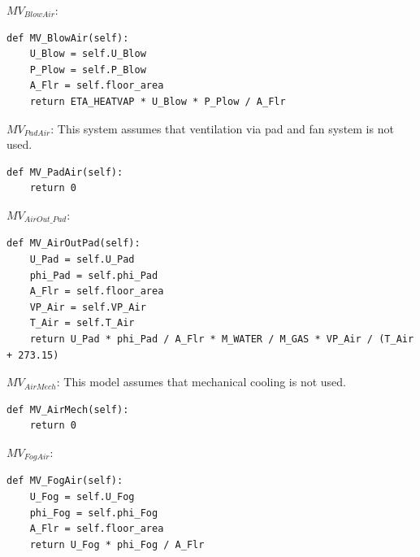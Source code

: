 \documentclass[a4paper]{article}
\numberwithin{equation}{section}
\begin{document}
\(MV_{BlowAir}\):
\begin{mdframed}[leftline=false,rightline=false,backgroundcolor=magenta!10,nobreak=true]
  \begin{verbatim}
def MV_BlowAir(self):
    U_Blow = self.U_Blow
    P_Plow = self.P_Blow
    A_Flr = self.floor_area
    return ETA_HEATVAP * U_Blow * P_Plow / A_Flr
  \end{verbatim}
\end{mdframed}

\(MV_{PadAir}\):
This system assumes that ventilation via pad and fan system is not used.
\begin{mdframed}[leftline=false,rightline=false,backgroundcolor=magenta!10,nobreak=true]
  \begin{verbatim}
def MV_PadAir(self):
    return 0
  \end{verbatim}
\end{mdframed}

\(MV_{AirOut\_Pad}\):
\begin{mdframed}[leftline=false,rightline=false,backgroundcolor=magenta!10,nobreak=true]
  \begin{verbatim}
def MV_AirOutPad(self):
    U_Pad = self.U_Pad
    phi_Pad = self.phi_Pad
    A_Flr = self.floor_area
    VP_Air = self.VP_Air
    T_Air = self.T_Air
    return U_Pad * phi_Pad / A_Flr * M_WATER / M_GAS * VP_Air / (T_Air + 273.15)
  \end{verbatim}
\end{mdframed}

\(MV_{AirMech}\):
This model assumes that mechanical cooling is not used.
\begin{mdframed}[leftline=false,rightline=false,backgroundcolor=magenta!10,nobreak=true]
  \begin{verbatim}
def MV_AirMech(self):
    return 0
  \end{verbatim}
\end{mdframed}

\(MV_{FogAir}\):
\begin{mdframed}[leftline=false,rightline=false,backgroundcolor=magenta!10,nobreak=true]
  \begin{verbatim}
def MV_FogAir(self):
    U_Fog = self.U_Fog
    phi_Fog = self.phi_Fog
    A_Flr = self.floor_area
    return U_Fog * phi_Fog / A_Flr
  \end{verbatim}
\end{mdframed}
\end{document}
